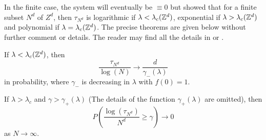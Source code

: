 In the finite case, the system will eventually be $\equiv 0$ but \cite{Liggett1999} showed that for a finite subset $N^d$ of $Z^d$, then $\tau_{N^d}$ is logarithmic if $\lambda < \lambda_c(\mathbb{Z}^d)$, exponential if $\lambda > \lambda_c(\mathbb{Z}^d)$ and polynomial if $\lambda = \lambda_c(\mathbb{Z}^d)$.
The precise theorems are given below without further comment or details.
The reader may find all the details in \cite{Liggett1999} or \cite{Liggett2002}.

\begin{theorem}\cite{Liggett1999}
If $\lambda < \lambda_c(\mathbb{Z}^d)$, then
$$
\frac{\tau_{N^d}}{\log(N)} \to \frac{d}{\gamma_{-}(\lambda)}
$$
in probability, where $\gamma_{-}$ is decreasing in $\lambda$ with $f(0) = 1$.
\end{theorem}

\begin{theorem}\cite{Liggett1999}
If $\lambda > \lambda_c$ and $\gamma > \gamma_+(\lambda)$ (The details of the function $\gamma_+(\lambda)$ are omitted), then
$$
P\left(\frac{\log(\tau_{N^d})}{N^d} \geq \gamma \right) \to 0
$$
as $N \to \infty$.
\end{theorem}




